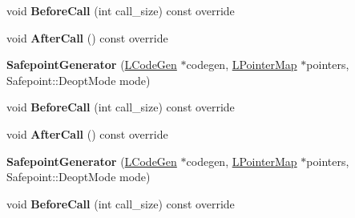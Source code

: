\begin{DoxyCompactItemize}
\item 
void {\bfseries Before\+Call} (int call\+\_\+size) const  override\hypertarget{classv8_1_1internal_1_1_safepoint_generator_a7b03e6da476c179ce443391b5bd938c3}{}\label{classv8_1_1internal_1_1_safepoint_generator_a7b03e6da476c179ce443391b5bd938c3}

\item 
void {\bfseries After\+Call} () const  override\hypertarget{classv8_1_1internal_1_1_safepoint_generator_a32145b74058d317a4b7a01e894c17df8}{}\label{classv8_1_1internal_1_1_safepoint_generator_a32145b74058d317a4b7a01e894c17df8}

\item 
{\bfseries Safepoint\+Generator} (\hyperlink{classv8_1_1internal_1_1_l_code_gen}{L\+Code\+Gen} $\ast$codegen, \hyperlink{classv8_1_1internal_1_1_l_pointer_map}{L\+Pointer\+Map} $\ast$pointers, Safepoint\+::\+Deopt\+Mode mode)\hypertarget{classv8_1_1internal_1_1_safepoint_generator_a7a81102e43adaf0a004c32f46d708577}{}\label{classv8_1_1internal_1_1_safepoint_generator_a7a81102e43adaf0a004c32f46d708577}

\item 
void {\bfseries Before\+Call} (int call\+\_\+size) const  override\hypertarget{classv8_1_1internal_1_1_safepoint_generator_a7b03e6da476c179ce443391b5bd938c3}{}\label{classv8_1_1internal_1_1_safepoint_generator_a7b03e6da476c179ce443391b5bd938c3}

\item 
void {\bfseries After\+Call} () const  override\hypertarget{classv8_1_1internal_1_1_safepoint_generator_a32145b74058d317a4b7a01e894c17df8}{}\label{classv8_1_1internal_1_1_safepoint_generator_a32145b74058d317a4b7a01e894c17df8}

\item 
{\bfseries Safepoint\+Generator} (\hyperlink{classv8_1_1internal_1_1_l_code_gen}{L\+Code\+Gen} $\ast$codegen, \hyperlink{classv8_1_1internal_1_1_l_pointer_map}{L\+Pointer\+Map} $\ast$pointers, Safepoint\+::\+Deopt\+Mode mode)\hypertarget{classv8_1_1internal_1_1_safepoint_generator_a7a81102e43adaf0a004c32f46d708577}{}\label{classv8_1_1internal_1_1_safepoint_generator_a7a81102e43adaf0a004c32f46d708577}

\item 
void {\bfseries Before\+Call} (int call\+\_\+size) const  override\hypertarget{classv8_1_1internal_1_1_safepoint_generator_a7b03e6da476c179ce443391b5bd938c3}{}\label{classv8_1_1internal_1_1_safepoint_generator_a7b03e6da476c179ce443391b5bd938c3}


\end{DoxyCompactItemize}
